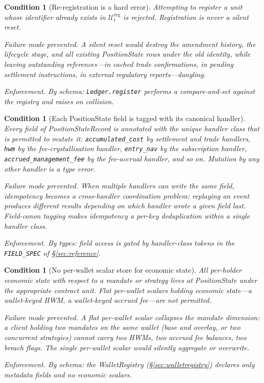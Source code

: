 \documentclass[11pt,a4paper]{article}
\newtheorem{condition}[definition]{Condition}
\begin{document}
\begin{condition}[Re-registration is a hard error]\label{cond:rereg}
Attempting to register a unit whose identifier already exists in $\mathcal{U}_t^{\mathrm{reg}}$ is rejected. Registration is never a silent reset.

\emph{Failure mode prevented.} A silent reset would destroy the amendment history, the lifecycle stage, and all existing PositionState rows under the old identity, while leaving outstanding references---in cached trade confirmations, in pending settlement instructions, in external regulatory reports---dangling.

\emph{Enforcement.} By schema: \texttt{Ledger.register} performs a compare-and-set against the registry and raises on collision.
\end{condition}

\begin{condition}[Each PositionState field is tagged with its canonical handler]\label{cond:fieldcanon}
Every field of PositionStateRecord is annotated with the unique handler class that is permitted to mutate it: \texttt{accumulated\_cost} by settlement and trade handlers, \texttt{hwm} by the fee-crystallisation handler, \texttt{entry\_nav} by the subscription handler, \texttt{accrued\_management\_fee} by the fee-accrual handler, and so on. Mutation by any other handler is a type error.

\emph{Failure mode prevented.} When multiple handlers can write the same field, idempotency becomes a cross-handler coordination problem: replaying an event produces different results depending on which handler wrote a given field last. Field-canon tagging makes idempotency a per-key deduplication within a single handler class.

\emph{Enforcement.} By types: field access is gated by handler-class tokens in the \texttt{FIELD\_SPEC} of \S\ref{sec:reference}.
\end{condition}

\begin{condition}[No per-wallet scalar store for economic state]\label{cond:wcollapse}
All per-holder economic state with respect to a mandate or strategy lives at PositionState under the appropriate contract unit. Flat per-wallet scalars holding economic state---a wallet-keyed HWM, a wallet-keyed accrued fee---are not permitted.

\emph{Failure mode prevented.} A flat per-wallet scalar collapses the mandate dimension: a client holding two mandates on the same wallet (base and overlay, or two concurrent strategies) cannot carry two HWMs, two accrued fee balances, two breach flags. The single per-wallet scalar would silently aggregate or overwrite.

\emph{Enforcement.} By schema: the WalletRegistry (\S\ref{sec:walletregistry}) declares only metadata fields and no economic scalars.
\end{condition}
\end{document}
